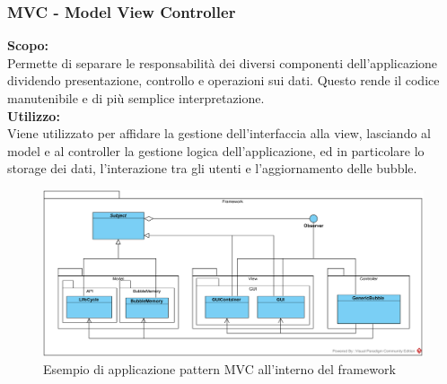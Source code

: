 \subsubsection{MVC - Model View Controller}
\textbf{Scopo:}\\ 
Permette di separare le responsabilità dei diversi componenti dell'applicazione dividendo presentazione, controllo e operazioni sui dati. Questo rende il codice manutenibile e di più semplice interpretazione.\\
\textbf{Utilizzo:}\\
Viene utilizzato per affidare la gestione dell'interfaccia alla view, lasciando al model e al controller la gestione logica dell'applicazione, ed in particolare lo storage dei dati, l'interazione tra gli utenti e l'aggiornamento delle bubble.
\begin{figure}[H]
	\centering
	\includegraphics[width=15cm]{./diagrammi_img/applicazione_pattern/mvc_framework.png}
	\caption{Esempio di applicazione pattern MVC all'interno del framework}
\end{figure}



